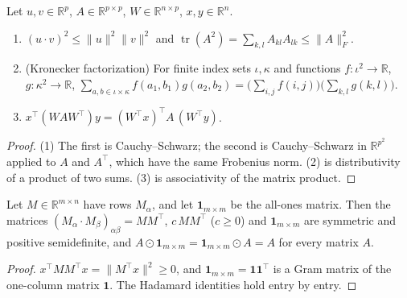 \begin{lemma}\label{lem:ntkcond:elementary}
  \leanok
Let $u,v\in\mathbb R^p$, $A\in\mathbb R^{p\times p}$, $W\in\mathbb R^{n\times p}$, $x,y\in\mathbb R^n$.
\begin{enumerate}
  \item $(u\cdot v)^2\le\|u\|^2\|v\|^2$ and $\operatorname{tr}(A^2)=\sum_{k,l}A_{kl}A_{lk}\le\|A\|_F^2$.
  \item (Kronecker factorization) For finite index sets $\iota,\kappa$ and functions $f:\iota^2\to\mathbb R$, $g:\kappa^2\to\mathbb R$,
        $\sum_{a,b\in\iota\times\kappa}f(a_1,b_1)g(a_2,b_2)=\bigl(\sum_{i,j}f(i,j)\bigr)\bigl(\sum_{k,l}g(k,l)\bigr)$.
  \item $x^\top(WAW^\top)y=(W^\top x)^\top A\,(W^\top y)$.
\end{enumerate}
\end{lemma}

\begin{proof}
  \leanok
(1) The first is Cauchy--Schwarz; the second is Cauchy--Schwarz in $\mathbb R^{p^2}$ applied to $A$ and $A^\top$, which have the same Frobenius norm. (2) is distributivity of a product of two sums. (3) is associativity of the matrix product.
\end{proof}

\begin{lemma}\label{lem:ntkcond:gram}
  \leanok
Let $M\in\mathbb R^{m\times n}$ have rows $M_\alpha$, and let $\mathbf 1_{m\times m}$ be the all-ones matrix. Then the matrices $(M_\alpha\cdot M_\beta)_{\alpha\beta}=MM^\top$, $c\,MM^\top$ ($c\ge0$) and $\mathbf 1_{m\times m}$ are symmetric and positive semidefinite, and $A\odot\mathbf 1_{m\times m}=\mathbf 1_{m\times m}\odot A=A$ for every matrix $A$.
\end{lemma}

\begin{proof}
  \leanok
$x^\top MM^\top x=\|M^\top x\|^2\ge0$, and $\mathbf 1_{m\times m}=\mathbf 1\mathbf 1^\top$ is a Gram matrix of the one-column matrix $\mathbf 1$. The Hadamard identities hold entry by entry.
\end{proof}

